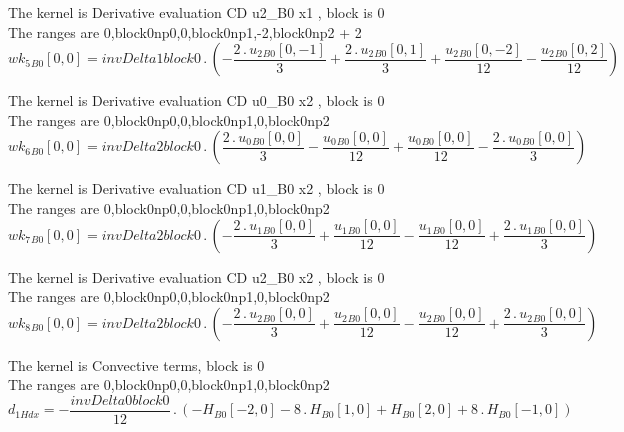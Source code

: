 \documentclass{article}
\begin{document}
\noindent The kernel is Derivative evaluation CD u2_B0 x1 , block is 0\\\noindent The ranges are 0,block0np0,0,block0np1,-2,block0np2 + 2\\\begin{dmath}{wk_{5}{_{B0}}}[{0,0}] = invDelta1block0 \,.\, \left(- \frac{2 \,.\, {u_{2}{_{B0}}}[{0,-1}]}{3} + \frac{2 \,.\, {u_{2}{_{B0}}}[{0,1}]}{3} + \frac{{u_{2}{_{B0}}}[{0,-2}]}{12} - \frac{{u_{2}{_{B0}}}[{0,2}]}{12}\right)\end{dmath}

\noindent The kernel is Derivative evaluation CD u0_B0 x2 , block is 0\\\noindent The ranges are 0,block0np0,0,block0np1,0,block0np2\\\begin{dmath}{wk_{6}{_{B0}}}[{0,0}] = invDelta2block0 \,.\, \left(\frac{2 \,.\, {u_{0}{_{B0}}}[{0,0}]}{3} - \frac{{u_{0}{_{B0}}}[{0,0}]}{12} + \frac{{u_{0}{_{B0}}}[{0,0}]}{12} - \frac{2 \,.\, {u_{0}{_{B0}}}[{0,0}]}{3}\right)\end{dmath}

\noindent The kernel is Derivative evaluation CD u1_B0 x2 , block is 0\\\noindent The ranges are 0,block0np0,0,block0np1,0,block0np2\\\begin{dmath}{wk_{7}{_{B0}}}[{0,0}] = invDelta2block0 \,.\, \left(- \frac{2 \,.\, {u_{1}{_{B0}}}[{0,0}]}{3} + \frac{{u_{1}{_{B0}}}[{0,0}]}{12} - \frac{{u_{1}{_{B0}}}[{0,0}]}{12} + \frac{2 \,.\, {u_{1}{_{B0}}}[{0,0}]}{3}\right)\end{dmath}

\noindent The kernel is Derivative evaluation CD u2_B0 x2 , block is 0\\\noindent The ranges are 0,block0np0,0,block0np1,0,block0np2\\\begin{dmath}{wk_{8}{_{B0}}}[{0,0}] = invDelta2block0 \,.\, \left(- \frac{2 \,.\, {u_{2}{_{B0}}}[{0,0}]}{3} + \frac{{u_{2}{_{B0}}}[{0,0}]}{12} - \frac{{u_{2}{_{B0}}}[{0,0}]}{12} + \frac{2 \,.\, {u_{2}{_{B0}}}[{0,0}]}{3}\right)\end{dmath}

\noindent The kernel is Convective terms, block is 0\\\noindent The ranges are 0,block0np0,0,block0np1,0,block0np2\\\begin{dmath}d_{1 H dx} = - \frac{invDelta0block0}{12} \,.\, \left(- {H{_{B0}}}[{-2,0}] - 8 \,.\, {H{_{B0}}}[{1,0}] + {H{_{B0}}}[{2,0}] + 8 \,.\, {H{_{B0}}}[{-1,0}]\right)\end{dmath}
\end{document}
